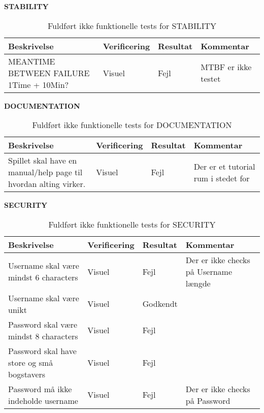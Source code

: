 \bf{STABILITY}
\begin{table}[H]
\caption{ Fuldført ikke funktionelle tests for STABILITY}
\label{tab:}
\begin{tabular}{|p{3cm}|p{3cm}|p{3cm}|p{3cm}|}
\hline
Beskrivelse & Verificering & Resultat & Kommentar \\
\hline
 MEANTIME BETWEEN FAILURE 1Time + 10Min? & Visuel & Fejl & MTBF er ikke testet \\
\hline
\end{tabular}
\end{table}

\bf{DOCUMENTATION}
\begin{table}[H]
\caption{ Fuldført ikke funktionelle tests for DOCUMENTATION}
\label{tab:}
\begin{tabular}{|p{3cm}|p{3cm}|p{3cm}|p{3cm}|}
\hline
Beskrivelse & Verificering & Resultat & Kommentar \\
\hline
Spillet skal have en manual/help page til hvordan alting virker. & Visuel & Fejl & Der er et tutorial rum i stedet for \\
\hline
\end{tabular}
\end{table}

\bf{SECURITY}
\begin{table}[H]
\caption{ Fuldført ikke funktionelle tests for SECURITY}
\label{tab:}
\begin{tabular}{|p{3cm}|p{3cm}|p{3cm}|p{3cm}|}
\hline
Beskrivelse & Verificering & Resultat & Kommentar \\
\hline
 Username skal være mindst 6 characters & Visuel & Fejl & Der er ikke checks på Username længde\\
\hline
 Username skal være unikt & Visuel & Godkendt & \\
\hline
 Password skal være mindst 8 characters & Visuel & Fejl & \\
\hline
 Password skal have store og små bogstavers & Visuel & Fejl & \\
\hline
 Password må ikke indeholde username & Visuel & Fejl & Der er ikke checks på Password \\
\hline
\end{tabular}
\end{table}
